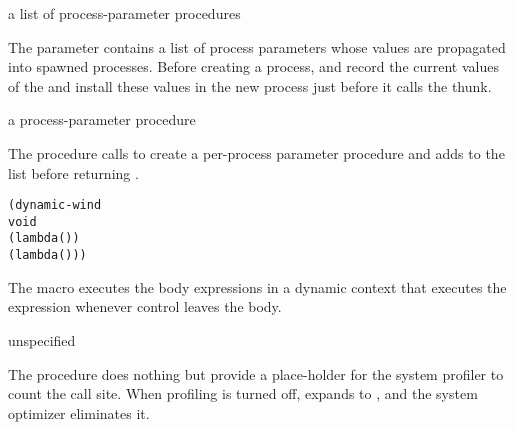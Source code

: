 \begin{parameter}
\end{parameter}
\hasvalue{} a list of process-parameter procedures

The  parameter contains a list of
process parameters whose values are propagated into spawned
processes.
Before creating a process,  and 
record the current values of the 
and install these values in the new process just before it calls
the thunk.

\begin{procedure}
\end{procedure}
\returns{} a process-parameter procedure

The  procedure calls
 to create a per-process
parameter procedure  and adds  to the
 list before returning .

\begin{syntax}
\end{syntax}
\expandsto{}\begin{alltt}\antipar
(dynamic-wind
  void
  (lambda ()   \etc{})
  (lambda () ))\end{alltt}

The  macro executes the body expressions 
 \etc{} in a dynamic context that executes the 
expression whenever control leaves the body.

\begin{procedure}
\end{procedure}
\returns{} unspecified

The  procedure does nothing but provide a
place-holder for the system profiler to count the call site. When
profiling is turned off,  expands to
, and the system optimizer eliminates it.

